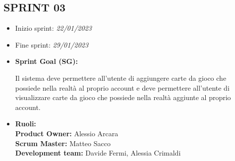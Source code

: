 \documentclass[a4paper, oneside]{article}
\begin{document}
\begin{landscape}
        \newpage
        \section{SPRINT 03}
        \begin{itemize}
            \item Inizio sprint: \textit{22/01/2023}
            \item Fine sprint: \textit{29/01/2023}
        \end{itemize}
        \begin{itemize}
            \item \textbf{Sprint Goal (SG):} \\
            \begin{indent}
                \newline Il sistema deve permettere all’utente di aggiungere carte da gioco che possiede nella realtà al proprio account e deve permettere all’utente di visualizzare carte da gioco che possiede nella realtà aggiunte al proprio account. \\
            \end{indent}
        \end{itemize}
        \begin{itemize}
            \item \textbf{Ruoli:}\\
            \textbf{Product Owner:} Alessio Arcara \\
            \textbf{Scrum Master:} Matteo Sacco \\
            \textbf{Development team:} Davide Fermi, Alessia Crimaldi \\
        \end{itemize}
        \vspace{2mm} %

\end{landscape}
\end{document}
